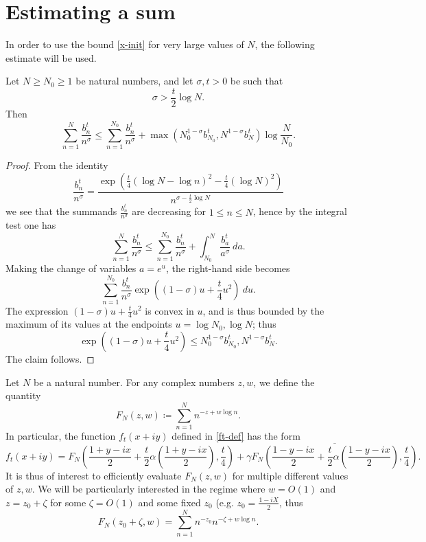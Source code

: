 \section{Estimating a sum}

In order to use the bound \eqref{x-init} for very large values of $N$, the following estimate will be used.

\begin{lemma}\label{largen}
Let $N \geq N_0 \geq 1$ be natural numbers, and let $\sigma,t > 0$ be such that
$$ \sigma > \frac{t}{2} \log N.$$
Then
$$ \sum_{n=1}^N \frac{b_n^t}{n^\sigma} \leq \sum_{n=1}^{N_0}
\frac{b_n^t}{n^\sigma}  + 
\max( N_0^{1-\sigma} b_{N_0}^t, N^{1-\sigma} b_N^t ) \log \frac{N}{N_0}.$$
\end{lemma}

\begin{proof}  From the identity
$$ \frac{b_n^t}{n^\sigma} = \frac{\exp\left( \frac{t}{4} (\log N - \log n)^2 - \frac{t}{4} (\log N)^2\right) }{n^{\sigma - \frac{t}{2} \log N}}$$
we see that the summands $\frac{b_n^t}{n^\sigma}$ are decreasing for $1 \leq n \leq N$, hence by the integral test one has
$$ \sum_{n=1}^N \frac{b_n^t}{n^\sigma} \leq \sum_{n=1}^{N_0}
\frac{b_n^t}{n^\sigma}  + \int_{N_0}^N \frac{b_a^t}{a^\sigma}\ da.$$
Making the change of variables $a = e^u$, the right-hand side becomes
$$\sum_{n=1}^{N_0} \frac{b_n^t}{n^\sigma} \exp( (1-\sigma) u + \frac{t}{4} u^2 )\ du.$$
The expression $(1-\sigma) u + \frac{t}{4} u^2$ is convex in $u$, and is thus bounded by the maximum of its values at the endpoints $u = \log N_0, \log N$; thus
$$\exp( (1-\sigma) u + \frac{t}{4} u^2) \leq N_0^{1-\sigma} b_{N_0}^t, N^{1-\sigma} b_N^t.$$
The claim follows. 
\end{proof}

Let $N$ be a natural number.  For any complex numbers $z,w$, we define the quantity
$$ F_N(z,w) \coloneqq \sum_{n=1}^N  n^{-z + w \log n}.$$
In particular, the function $f_t(x+iy)$ defined in \eqref{ft-def} has the form
$$ f_t(x+iy) = F_N( \frac{1+y-ix}{2} + \frac{t}{2} \alpha(\frac{1+y-ix}{2}), \frac{t}{4} ) + \gamma \overline{F_N( \frac{1-y-ix}{2} + \frac{t}{2} \alpha(\frac{1-y-ix}{2}), \frac{t}{4} )}.$$
It is thus of interest to efficiently evaluate $F_N(z,w)$ for multiple different values of $z,w$.  We will be particularly interested in the regime where $w=O(1)$ and $z = z_0 + \zeta$ for some $\zeta = O(1)$ and some fixed $z_0$ (e.g. $z_0 = \frac{1-iX}{2}$, thus
$$F_N(z_0+\zeta, w) = \sum_{n=1}^N n^{-z_0} n^{-\zeta + w \log n}.$$

